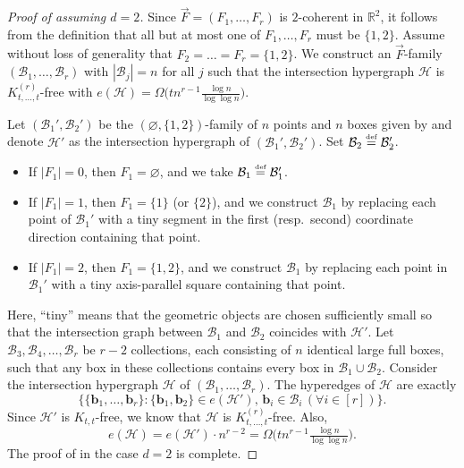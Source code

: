 \documentclass[11pt]{article}
\theoremstyle{definition}
\newcommand*{\eqdef}{\stackrel{\mbox{\normalfont\tiny def}}{=}} %
\newcommand*{\R}{\mathbb{R}}                                    %
\newcommand*{\cH}{\mathcal{H}}
\newcommand*{\vF}{\vec{F}}
\newcommand*{\cB}{\mathcal{B}}
\begin{document}
\begin{proof}[Proof of  assuming $d = 2$]
    Since $\vF = (F_1, \dots, F_r)$ is $2$-coherent in $\R^2$, it follows from the definition that all but at most one of $F_1, \dots, F_r$ must be $\{1, 2\}$. Assume without loss of generality that $F_2 = \dots = F_r = \{1, 2\}$. We construct
    an $\vF$-family $(\cB_1, \dots, \cB_r)$ with $|\cB_j| = n$ for all $j$ such that the intersection hypergraph $\cH$ is $K^{(r)}_{t, \dots, t}$-free with $e(\cH) = \Omega \bigl( tn^{r-1} \frac{\log n}{\log\log n} \bigr)$. 

    Let $(\cB_1', \cB_2')$ be the $(\varnothing, \{1, 2\})$-family of $n$ points and $n$ boxes given by  and denote $\cH'$ as the intersection hypergraph of $(\cB_1', \cB_2')$. Set $\cB_2 \eqdef \cB_2'$. 
    \vspace{-0.5em}
    \begin{itemize}
        \item If $|F_1| = 0$, then $F_1 = \varnothing$, and we take $\cB_1 \eqdef \cB_1'$. 
        \vspace{-0.5em}
        \item If $|F_1| = 1$, then $F_1 = \{1\}$ (or $\{2\}$), and we construct $\mathcal{B}_1$ by replacing each point of $\mathcal{B}_1'$ with a tiny segment in the first (resp.~second) coordinate direction containing that point. 
        \vspace{-0.5em}
        \item If $|F_1| = 2$, then $F_1 = \{1, 2\}$, and we construct $\cB_1$ by replacing each point in $\cB_1'$ with a tiny axis-parallel square containing that point. 
    \end{itemize}
    \vspace{-0.5em}
    Here, ``tiny'' means that the geometric objects are chosen sufficiently small so that the intersection graph between $\cB_1$ and $\cB_2$ coincides with $\cH'$.
    Let $\cB_3, \cB_4, \dots, \cB_r$ be $r - 2$ collections, each consisting of $n$ identical large full boxes, such that any box in these collections contains every box in $\mathcal{B}_1 \cup \mathcal{B}_2$. Consider the intersection hypergraph $\cH$ of $(\cB_1, \dots, \cB_r)$. The hyperedges of $\cH$ are exactly
    \[
    \bigl\{ \{\bm{b}_1, \dots, \bm{b}_r\} : \{\bm{b}_1, \bm{b}_2\} \in e(\cH'), \, \bm{b}_i \in \cB_i \, (\forall i \in [r]) \bigr\}.
    \]
    Since $\cH'$ is $K_{t, t}$-free, we know that $\cH$ is $K^{(r)}_{t, \dots, t}$-free. Also, 
    \[
    e(\cH) = e(\cH') \cdot n^{r-2} = \Omega \bigl( tn^{r-1} \tfrac{\log n}{\log\log n} \bigr). 
    \]
    The proof of  in the case $d = 2$ is complete. 
\end{proof}
\end{document}
